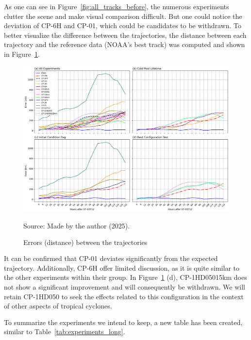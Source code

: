 As one can see in Figure~\ref{fig:all_tracks_before}, the numerous experiments clutter the scene and make visual comparison difficult. But one could notice the deviation of CP-6H and CP-01, which could be candidates to be withdrawn. To better visualize the difference between the trajectories, the distance between each trajectory and the reference data (NOAA’s best track) was computed and shown in Figure~\ref{fig:panel_errors_before}.

\begin{figure}[!htb]
    \centering
    \caption{Errors (distance) between the trajectories} %
    \includegraphics[width=\textwidth]{docs/figuras/chapter5/panel_2x2_error_comparison.png} %
    \vspace{0.5em}
    
    Source: Made by the author (2025). %
    \label{fig:panel_errors_before} %
\end{figure}

\pagebreak

It can be confirmed that CP-01 deviates significantly from the expected trajectory. Additionally, CP-6H offer limited discussion, as it is quite similar to the other experiments within their group. In Figure~\ref{fig:panel_errors_before} (d), CP-1HD05015km does not show a significant improvement and will consequently be withdrawn. We will retain CP-1HD050 to seek the effects related to this configuration in the context of other aspects of tropical cyclones.

To summarize the experiments we intend to keep, a new table has been created, similar to Table~\ref{tab:experiments_long}.

